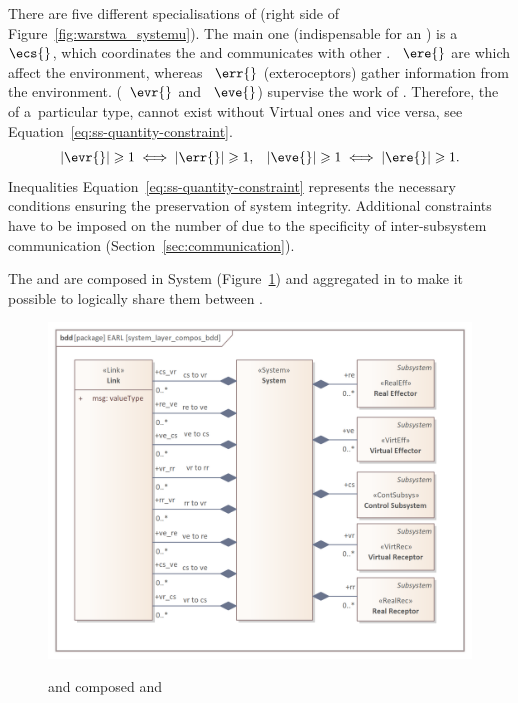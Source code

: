 \documentclass[11pt,oneside,a4paper]{article}
\newcommand{\Figure}[0]{Figure}
\begin{document}
	There are five different specialisations of \Subsystems{} (right side of \Figure{}~\ref{fig:warstwa_systemu}). The main one (indispensable for an \Agent{}) is a~\ControlSubsystem{}~$\ecs{}$, which coordinates the \Agentapostrofs{} \Subsystems{} and communicates with other \Agents{}.
	\RealEffectors{}~$\ere{}$ are \Subsystems{} which affect the environment, whereas \RealReceptors{}~$\err{}$ (exteroceptors) gather information from the environment. \VirtualSubsystems{} (\VirtualReceptors{}~$\evr{}$ and \VirtualEffectors{}~$\eve{}$) supervise the work of \RealSubsystems{}. Therefore, the \RealSubsystems{} of a~particular type, cannot exist without Virtual ones and vice versa, see Equation~\eqref{eq:ss-quantity-constraint}. 
	\begin{equation}
	|\evr{}| \geqslant 1 \iff |\err{}| \geqslant 1,\;\;\;
	|\eve{}| \geqslant 1 \iff |\ere{}| \geqslant 1.
	\label{eq:ss-quantity-constraint}
	\end{equation}
	Inequalities Equation~\eqref{eq:ss-quantity-constraint} represents the necessary conditions ensuring the preservation of system integrity.
	Additional constraints have to be imposed on the number of \Subsystems{} due to the specificity of inter-subsystem communication \Links{} (Section~\ref{sec:communication}).
	
	The \Links{} and \Subsystems{} are composed in System (\Figure{}~\ref{fig:system_layer_compos_bdd}) and aggregated in \Agent{} to make it possible to logically share them between \Agents{}.
	
	\begin{figure}[H]
		\centering
		\begin{center}
			{\includegraphics[width=.8\columnwidth]{img/basic_earl_model/system_layer_compos_bdd.png}}
		\end{center}
		\caption{\System{} and composed \Links{} and \Subsystems{}} 
		\label{fig:system_layer_compos_bdd}
	\end{figure}
		
\end{document}
